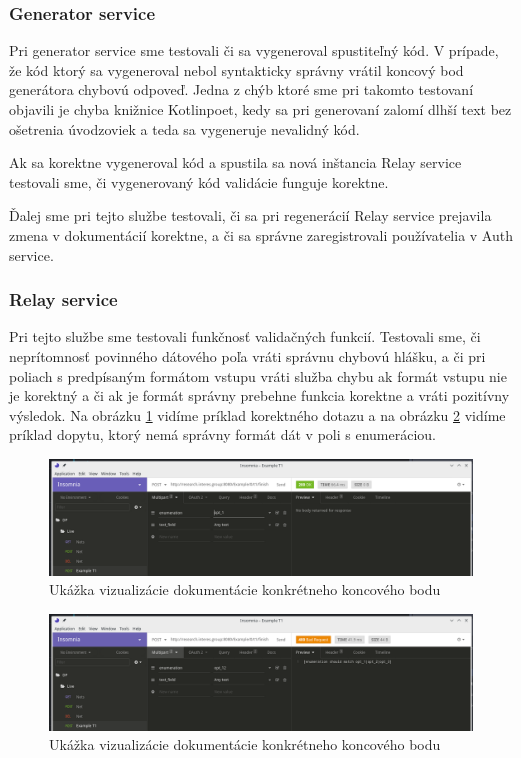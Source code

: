 \subsubsection{Generator service}
Pri generator service sme testovali či sa vygeneroval spustiteľný kód. V prípade, že kód ktorý sa vygeneroval nebol syntakticky správny vrátil koncový bod generátora chybovú odpoveď. Jedna z chýb ktoré sme pri takomto testovaní objavili je chyba knižnice Kotlinpoet, kedy sa pri generovaní zalomí dlhší text bez ošetrenia úvodzoviek a teda sa vygeneruje nevalidný kód.

Ak sa korektne vygeneroval kód a spustila sa nová inštancia Relay service testovali sme, či vygenerovaný kód validácie funguje korektne.

Ďalej sme pri tejto službe testovali, či sa pri regenerácií Relay service prejavila zmena v dokumentácií korektne, a či sa správne zaregistrovali používatelia v Auth service.

\subsubsection{Relay service}
Pri tejto službe sme testovali funkčnosť validačných funkcií. Testovali sme, či neprítomnosť povinného dátového poľa vráti správnu chybovú hlášku, a či pri poliach s predpísaným formátom vstupu vráti služba chybu ak formát vstupu nie je korektný a či ak je formát správny prebehne funkcia korektne a vráti pozitívny výsledok. Na obrázku \ref{insomnia_200} vidíme príklad korektného dotazu a na obrázku \ref{insomnia_400} vidíme príklad dopytu, ktorý nemá správny formát dát v poli s enumeráciou.

\begin{figure}[!htbp]
	\centering
	\includegraphics[width=16cm]{img/insomnia_200.png}
    \caption{Ukážka vizualizácie dokumentácie konkrétneho koncového bodu}
	\label{insomnia_200}
\end{figure}

\begin{figure}[!htbp]
	\centering
	\includegraphics[width=16cm]{img/insomnia_400.png}
    \caption{Ukážka vizualizácie dokumentácie konkrétneho koncového bodu}
	\label{insomnia_400}
\end{figure}

